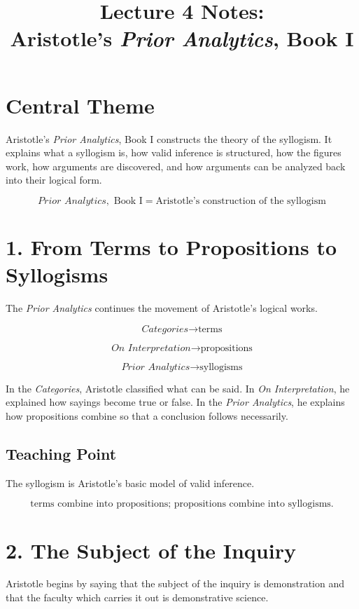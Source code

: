 \documentclass[12pt]{article}
\title{Lecture 4 Notes:\\ Aristotle's \textit{Prior Analytics}, Book I}
\author{}
\date{}
\begin{document}
\maketitle

\section*{Central Theme}

Aristotle's \textit{Prior Analytics}, Book I constructs the theory of the
syllogism. It explains what a syllogism is, how valid inference is structured,
how the figures work, how arguments are discovered, and how arguments can be
analyzed back into their logical form.

\[
\boxed{
\textit{Prior Analytics}, \text{ Book I}
=
\text{Aristotle's construction of the syllogism}
}
\]

\section*{1. From Terms to Propositions to Syllogisms}

The \textit{Prior Analytics} continues the movement of Aristotle's logical
works.

\[
\textit{Categories} \rightarrow \text{terms}
\]

\[
\textit{On Interpretation} \rightarrow \text{propositions}
\]

\[
\textit{Prior Analytics} \rightarrow \text{syllogisms}
\]

In the \textit{Categories}, Aristotle classified what can be said. In
\textit{On Interpretation}, he explained how sayings become true or false. In
the \textit{Prior Analytics}, he explains how propositions combine so that a
conclusion follows necessarily.

\subsection*{Teaching Point}

The syllogism is Aristotle's basic model of valid inference.

\[
\boxed{
\text{terms combine into propositions; propositions combine into syllogisms.}
}
\]

\section*{2. The Subject of the Inquiry}

Aristotle begins by saying that the subject of the inquiry is demonstration and
that the faculty which carries it out is demonstrative science.
\end{document}
